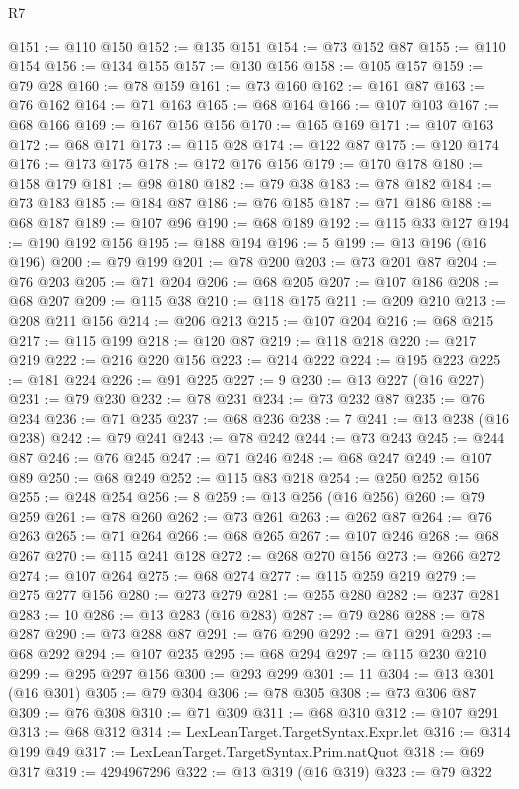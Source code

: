 \begin{lexlean}{R7}
\begin{coremodule}
@151 := @110 @150
@152 := @135 @151
@154 := @73 @152 @87
@155 := @110 @154
@156 := @134 @155
@157 := @130 @156
@158 := @105 @157
@159 := @79 @28
@160 := @78 @159
@161 := @73 @160
@162 := @161 @87
@163 := @76 @162
@164 := @71 @163
@165 := @68 @164
@166 := @107 @103
@167 := @68 @166
@169 := @167 @156 @156
@170 := @165 @169
@171 := @107 @163
@172 := @68 @171
@173 := @115 @28
@174 := @122 @87
@175 := @120 @174
@176 := @173 @175
@178 := @172 @176 @156
@179 := @170 @178
@180 := @158 @179
@181 := @98 @180
@182 := @79 @38
@183 := @78 @182
@184 := @73 @183
@185 := @184 @87
@186 := @76 @185
@187 := @71 @186
@188 := @68 @187
@189 := @107 @96
@190 := @68 @189
@192 := @115 @33 @127
@194 := @190 @192 @156
@195 := @188 @194
@196 := 5
@199 := @13 @196 (@16 @196)
@200 := @79 @199
@201 := @78 @200
@203 := @73 @201 @87
@204 := @76 @203
@205 := @71 @204
@206 := @68 @205
@207 := @107 @186
@208 := @68 @207
@209 := @115 @38
@210 := @118 @175
@211 := @209 @210
@213 := @208 @211 @156
@214 := @206 @213
@215 := @107 @204
@216 := @68 @215
@217 := @115 @199
@218 := @120 @87
@219 := @118 @218
@220 := @217 @219
@222 := @216 @220 @156
@223 := @214 @222
@224 := @195 @223
@225 := @181 @224
@226 := @91 @225
@227 := 9
@230 := @13 @227 (@16 @227)
@231 := @79 @230
@232 := @78 @231
@234 := @73 @232 @87
@235 := @76 @234
@236 := @71 @235
@237 := @68 @236
@238 := 7
@241 := @13 @238 (@16 @238)
@242 := @79 @241
@243 := @78 @242
@244 := @73 @243
@245 := @244 @87
@246 := @76 @245
@247 := @71 @246
@248 := @68 @247
@249 := @107 @89
@250 := @68 @249
@252 := @115 @83 @218
@254 := @250 @252 @156
@255 := @248 @254
@256 := 8
@259 := @13 @256 (@16 @256)
@260 := @79 @259
@261 := @78 @260
@262 := @73 @261
@263 := @262 @87
@264 := @76 @263
@265 := @71 @264
@266 := @68 @265
@267 := @107 @246
@268 := @68 @267
@270 := @115 @241 @128
@272 := @268 @270 @156
@273 := @266 @272
@274 := @107 @264
@275 := @68 @274
@277 := @115 @259 @219
@279 := @275 @277 @156
@280 := @273 @279
@281 := @255 @280
@282 := @237 @281
@283 := 10
@286 := @13 @283 (@16 @283)
@287 := @79 @286
@288 := @78 @287
@290 := @73 @288 @87
@291 := @76 @290
@292 := @71 @291
@293 := @68 @292
@294 := @107 @235
@295 := @68 @294
@297 := @115 @230 @210
@299 := @295 @297 @156
@300 := @293 @299
@301 := 11
@304 := @13 @301 (@16 @301)
@305 := @79 @304
@306 := @78 @305
@308 := @73 @306 @87
@309 := @76 @308
@310 := @71 @309
@311 := @68 @310
@312 := @107 @291
@313 := @68 @312
@314 := LexLeanTarget.TargetSyntax.Expr.let
@316 := @314 @199 @49
@317 := LexLeanTarget.TargetSyntax.Prim.natQuot
@318 := @69 @317
@319 := 4294967296
@322 := @13 @319 (@16 @319)
@323 := @79 @322

\end{coremodule}
\end{lexlean}
